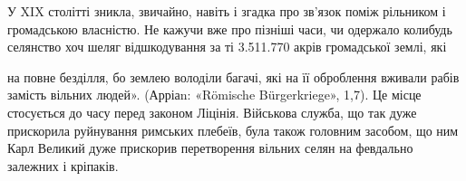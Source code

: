 У XIX столітті зникла, звичайно, навіть і згадка про зв’язок
поміж рільником і громадською власністю. Не кажучи вже
про пізніші часи, чи одержало колибудь селянство хоч шеляг
відшкодування за ті 3.511.770 акрів громадської землі, які

на повне безділля, бо землею володіли багачі, які на її оброблення вживали
рабів замість вільних людей». (Арріаn: «Römische Bürgerkriege»,
1,7). Це місце стосується до часу перед законом Ліцінія. Військова служба,
що так дуже прискорила руйнування римських плебеїв, була також
головним засобом, що ним Карл Великий дуже прискорив перетворення
вільних селян на февдально залежних і кріпаків.
\parbreak{}  %
